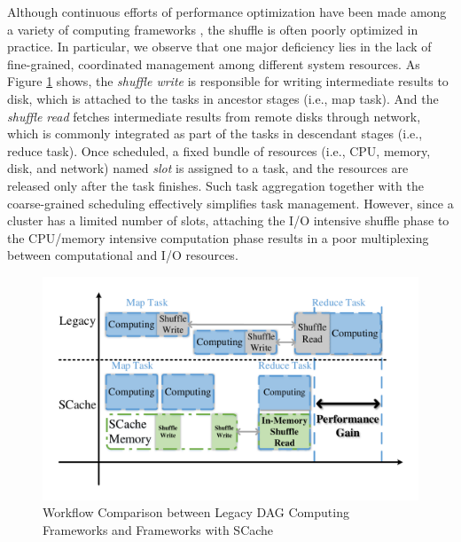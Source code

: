 Although continuous efforts of performance optimization have been made among a variety of computing frameworks \cite{sync, babu, tachyon, pacman, quincy, delay}, 
the shuffle is often poorly optimized in practice.
In particular, we observe that one major deficiency lies in the lack of fine-grained, coordinated management among different system resources.
As Figure \ref{fig:workflow} shows, the \textit{shuffle write} is responsible for writing intermediate results to disk, which is attached to the tasks in ancestor stages (i.e., map task).  
And the \textit{shuffle read} fetches intermediate results from remote disks through network, which is commonly integrated as part of the tasks in descendant stages (i.e., reduce task). 
Once scheduled, a fixed bundle of resources (i.e., CPU, memory, disk, and network) named \textit{slot} is assigned to a task, and the resources are released only after the task finishes.
Such task aggregation together with the coarse-grained scheduling effectively simplifies task management.
However, since a cluster has a limited number of slots, attaching the I/O intensive shuffle phase to the CPU/memory intensive computation phase results in a poor multiplexing between computational and I/O resources.
\begin{figure}
	\centering
	\includegraphics[width=\linewidth]{fig/workflow}
	\caption{Workflow Comparison between Legacy DAG Computing Frameworks and Frameworks with SCache}
	\label{fig:workflow}
\end{figure}

